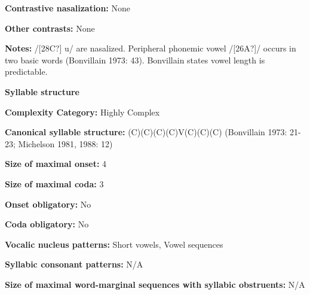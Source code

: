 \begin{styleBody}
\textbf{Contrastive nasalization:} None
\end{styleBody}

\begin{styleBody}
\textbf{Other contrasts:} None
\end{styleBody}

\begin{styleBody}
\textbf{Notes:} /[28C?] u/ are nasalized. Peripheral phonemic vowel /[26A?]/ occurs in two basic words (Bonvillain 1973: 43). Bonvillain states vowel length is predictable.
\end{styleBody}

\begin{styleBody}
\textbf{Syllable structure}
\end{styleBody}

\begin{styleBody}
\textbf{Complexity Category:} Highly Complex
\end{styleBody}

\begin{styleBody}
\textbf{Canonical syllable structure:} (C)(C)(C)(C)V(C)(C)(C)\textbf{ }(Bonvillain 1973: 21-23; Michelson 1981, 1988: 12)
\end{styleBody}

\begin{styleBody}
\textbf{Size of maximal onset:} 4
\end{styleBody}

\begin{styleBody}
\textbf{Size of maximal coda:} 3
\end{styleBody}

\begin{styleBody}
\textbf{Onset obligatory:} No
\end{styleBody}

\begin{styleBody}
\textbf{Coda obligatory:} No
\end{styleBody}

\begin{styleBody}
\textbf{Vocalic nucleus patterns:} Short vowels, Vowel sequences
\end{styleBody}

\begin{styleBody}
\textbf{Syllabic consonant patterns:} N/A
\end{styleBody}

\begin{styleBody}
\textbf{Size of maximal word{}-marginal sequences with syllabic obstruents:} N/A
\end{styleBody}

